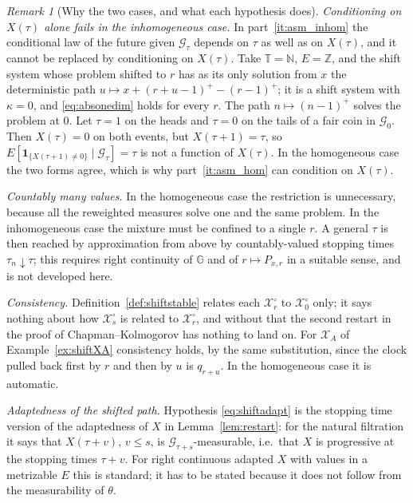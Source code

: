 \documentclass[11pt,a4paper]{article}
\theoremstyle{plain}
\theoremstyle{definition}
\theoremstyle{remark}
\newtheorem{remark}[theorem]{Remark}
\newcommand{\N}{\mathbb{N}}
\newcommand{\T}{\mathbb{T}}                     %
\newcommand{\Gilt}{\mathcal{G}}
\newcommand{\XX}{\mathcal{X}}                  %
\newcommand{\one}{\mathbf{1}}
\begin{document}
\begin{remark}[Why the two cases, and what each hypothesis does]
  \label{rem:strongmarkovscope}
  \emph{Conditioning on $X(\tau)$ alone fails in the inhomogeneous case.}  In
  part~\ref{it:asm_inhom} the conditional law of the future given $\Gilt_\tau$
  depends on $\tau$ as well as on $X(\tau)$, and it cannot be replaced by
  conditioning on $X(\tau)$.  Take $\T = \N$, $E = \mathbb{Z}$, and the shift
  system whose problem shifted to $r$ has as its only solution from $x$ the
  deterministic path $u \mapsto x + (r+u-1)^+ - (r-1)^+$; it is a shift system
  with $\kappa = 0$, and \eqref{eq:absonedim} holds for every $r$.  The path
  $n \mapsto (n-1)^+$ solves the problem at $0$.  Let $\tau = 1$ on the heads and
  $\tau = 0$ on the tails of a fair coin in $\Gilt_0$.  Then $X(\tau) = 0$ on
  both events, but $X(\tau+1) = \tau$, so
  $E[\one_{\{X(\tau+1) \neq 0\}} \mid \Gilt_\tau] = \tau$ is not a function of
  $X(\tau)$.  In the homogeneous case the two forms agree, which is why
  part~\ref{it:asm_hom} can condition on $X(\tau)$.

  \emph{Countably many values.}  In the homogeneous case the restriction is
  unnecessary, because all the reweighted measures solve one and the same
  problem.  In the inhomogeneous case the mixture must be confined to a single
  $r$.  A general $\tau$ is then reached by approximation from above by
  countably-valued stopping times $\tau_n \downarrow \tau$; this requires right
  continuity of $\mathbb{G}$ and of $r \mapsto P_{x,r}$ in a suitable sense, and
  is not developed here.

  \emph{Consistency.}  Definition~\ref{def:shiftstable} relates each
  $\XX^\circ_r$ to $\XX^\circ_0$ only; it says nothing about how $\XX^\circ_s$
  is related to $\XX^\circ_r$, and without that the second restart in the proof of
  Chapman--Kolmogorov has nothing to land on.  For $\XX_A$ of
  Example~\ref{ex:shiftXA} consistency holds, by the same substitution, since the
  clock pulled back first by $r$ and then by $u$ is $q_{r+u}$.  In the homogeneous
  case it is automatic.

  \emph{Adaptedness of the shifted path.}  Hypothesis \eqref{eq:shiftadapt} is
  the stopping time version of the adaptedness of $X$ in
  Lemma~\ref{lem:restart}: for the natural filtration it says that
  $X(\tau+v)$, $v \leq s$, is $\Gilt_{\tau+s}$-measurable, i.e.\ that $X$ is
  progressive at the stopping times $\tau+v$.  For right continuous adapted $X$
  with values in a metrizable $E$ this is standard; it has to be stated because
  it does not follow from the measurability of $\theta$.


\end{remark}
\end{document}
